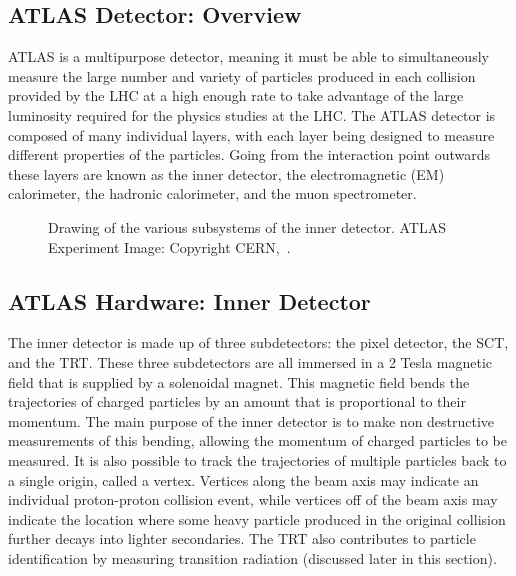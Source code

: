 \subsection{ATLAS Detector: Overview}

ATLAS is a multipurpose detector, meaning it must be able to simultaneously measure the large number and variety of particles produced in each collision provided by the LHC at a high enough rate to take advantage of the large luminosity required for the physics studies at the LHC. 
The ATLAS detector is composed of many individual layers, with each layer being designed to measure different properties of the particles.  
Going from the interaction point outwards these layers are known as the inner detector, the electromagnetic (EM) calorimeter, the hadronic calorimeter, and the muon spectrometer.   

\begin{figure}[!ht]
  \begin{center}
  \end{center}
  \caption[Layout of the ATLAS Inner Detector]
  {\small Drawing of the various subsystems of the inner detector.  ATLAS Experiment Image: Copyright CERN,~\cite{Pequenao:1095926}.}
\end{figure}

\subsection{ATLAS Hardware: Inner Detector}
\label{Sec.ID}
The inner detector is made up of three subdetectors: the pixel detector, the \gls{SCT}, and the \gls{TRT}.  
These three subdetectors are all immersed in a 2 Tesla magnetic field that is supplied by a solenoidal magnet.  
This magnetic field bends the trajectories of charged particles by an amount that is proportional to their momentum.  
The main purpose of the inner detector is to make non destructive measurements of this bending, allowing the momentum of charged particles to be measured.  
It is also possible to track the trajectories of multiple particles back to a single origin, called a vertex.  
Vertices along the beam axis may indicate an individual proton-proton collision event, while vertices off of the beam axis may indicate the location where some heavy particle produced in the original collision further decays into lighter secondaries.  
The \gls{TRT} also contributes to particle identification by measuring transition radiation (discussed later in this section).  
 
